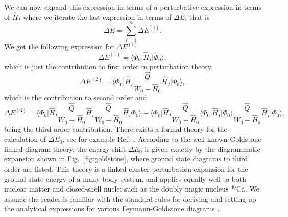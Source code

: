   We can now expand this expression in terms of a perturbative expression in
  terms of $\hat{H}_I$ where we iterate the last expression in terms
  of $\Delta E$, that is 
  \[
  \Delta E=\sum_{i=1}^{\infty}\Delta E^{(i)}.
  \]
  We get the following expression for $\Delta E^{(i)}$
  \[
  \Delta E^{(1)}=\langle \Phi_0\vert \hat{H}_I\vert \Phi_0\rangle,
  \] 
  which is just the contribution to first order in perturbation
  theory,
  \[
  \Delta E^{(2)}=\langle\Phi_0\vert
  \hat{H}_I\frac{\hat{Q}}{W_0-\hat{H}_0}\hat{H}_I\vert \Phi_0\rangle,
  \]
  which is the contribution to second order and
  \[
  \Delta E^{(3)}=\langle \Phi_0\vert
  \hat{H}_I\frac{\hat{Q}}{W_0-\hat{H}_0}\hat{H}_I\frac{\hat{Q}}{W_0-\hat{H}_0}\hat{H}_I\Phi_0\rangle-
  \langle\Phi_0\vert \hat{H}_I\frac{\hat{Q}}{W_0-\hat{H}_0}\langle
  \Phi_0\vert \hat{H}_I\vert
  \Phi_0\rangle\frac{\hat{Q}}{W_0-\hat{H}_0}\hat{H}_I\vert
  \Phi_0\rangle,
  \]
  being the third-order contribution.
  There exists a formal theory for the calculation
  of $\Delta E_0$, see for example Ref.~\cite{shavittbartlett2009}.  According to the well-known Goldstone
  linked-diagram theory, the energy shift $\Delta E_0$ is given
  exactly by the diagrammatic expansion shown in
  Fig.~\ref{fig:goldstone}, where ground state diagrams to third order are listed. This theory is a linked-cluster
  perturbation expansion for the ground state energy of a many-body
  system, and applies equally well to both nuclear matter and
  closed-shell nuclei such as the doubly magic nucleus $^{40}$Ca.  
We assume the reader is familiar 
with the standard rules for deriving and setting up the analytical expressions for various Feymann-Goldstone diagrams \cite{svavittbartlett2009}.
